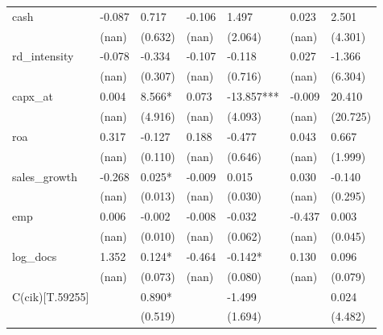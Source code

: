 \begin{table}
\begin{center}
\begin{tabular}{lllllll}
cash              & -0.087          & 0.717           & -0.106          & 1.497           & 0.023           & 2.501            \\
                  & (nan)           & (0.632)         & (nan)           & (2.064)         & (nan)           & (4.301)          \\
rd\_intensity     & -0.078          & -0.334          & -0.107          & -0.118          & 0.027           & -1.366           \\
                  & (nan)           & (0.307)         & (nan)           & (0.716)         & (nan)           & (6.304)          \\
capx\_at          & 0.004           & 8.566*          & 0.073           & -13.857***      & -0.009          & 20.410           \\
                  & (nan)           & (4.916)         & (nan)           & (4.093)         & (nan)           & (20.725)         \\
roa               & 0.317           & -0.127          & 0.188           & -0.477          & 0.043           & 0.667            \\
                  & (nan)           & (0.110)         & (nan)           & (0.646)         & (nan)           & (1.999)          \\
sales\_growth     & -0.268          & 0.025*          & -0.009          & 0.015           & 0.030           & -0.140           \\
                  & (nan)           & (0.013)         & (nan)           & (0.030)         & (nan)           & (0.295)          \\
emp               & 0.006           & -0.002          & -0.008          & -0.032          & -0.437          & 0.003            \\
                  & (nan)           & (0.010)         & (nan)           & (0.062)         & (nan)           & (0.045)          \\
log\_docs         & 1.352           & 0.124*          & -0.464          & -0.142*         & 0.130           & 0.096            \\
                  & (nan)           & (0.073)         & (nan)           & (0.080)         & (nan)           & (0.079)          \\
C(cik)[T.59255]   &                 & 0.890*          &                 & -1.499          &                 & 0.024            \\
                  &                 & (0.519)         &                 & (1.694)         &                 & (4.482)          \\

\end{tabular}
\end{center}
\end{table}

